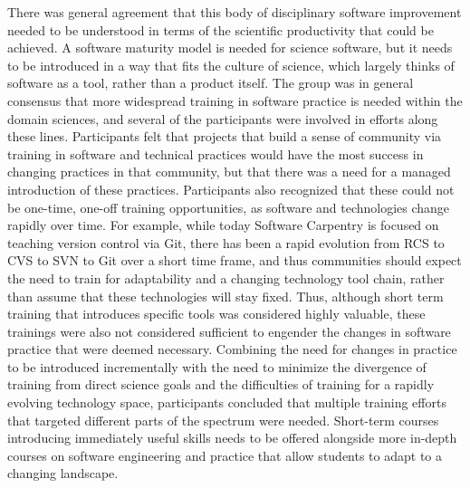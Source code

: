 \documentclass[11pt, oneside]{amsart}
\begin{document}
There was general agreement that this body of disciplinary software improvement
needed to be understood in terms of the scientific productivity that could be
achieved. A software maturity model is needed for science software, but it needs
to be introduced in a way that fits the culture of science, which largely thinks
of software as a tool, rather than a product itself. The group was in general
consensus that more widespread training in software practice is needed within
the domain sciences, and several of the participants were involved in efforts
along these lines. Participants felt that projects that build a sense of
community via training in software and technical practices would have the most
success in changing practices in that community, but that there was a need for a
managed introduction of these practices. Participants also recognized that these
could not be one-time, one-off training opportunities, as software and
technologies change rapidly over time. For example, while today Software
Carpentry is focused on teaching version control via Git, there has been a rapid
evolution from RCS to CVS to SVN to Git over a short time frame, and thus
communities should expect the need to train for adaptability and a changing
technology tool chain, rather than assume that these technologies will stay
fixed. Thus, although short term training that introduces specific tools was
considered highly valuable, these trainings were also not considered sufficient
to engender the changes in software practice that were deemed necessary.
Combining the need for changes in practice to be introduced incrementally with
the need to minimize the divergence of training from direct science goals and
the difficulties of training for a rapidly evolving technology space,
participants concluded that multiple training efforts that targeted different
parts of the spectrum were needed. Short-term courses introducing immediately
useful skills needs to be offered alongside more in-depth courses on software
engineering and practice that allow students to adapt to a changing landscape.
\end{document}
